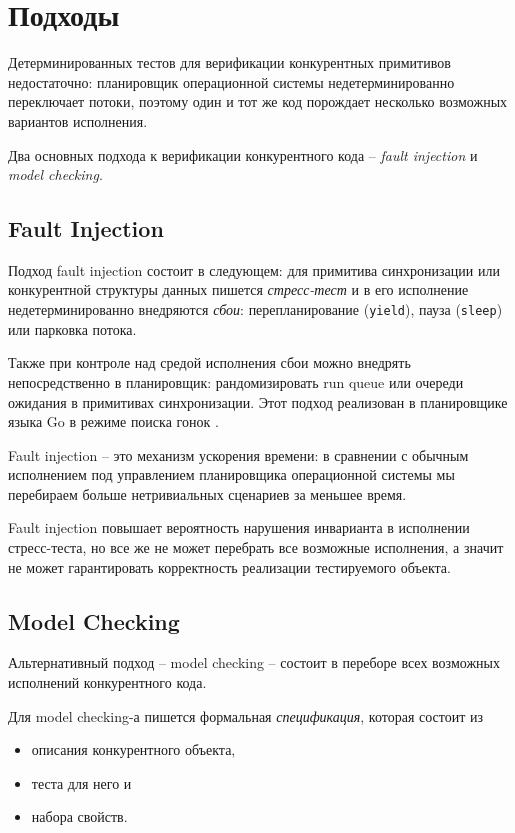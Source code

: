 \section{Подходы}

Детерминированных тестов для верификации конкурентных примитивов недостаточно: планировщик операционной системы недетерминированно переключает потоки, поэтому один и тот же код порождает несколько возможных вариантов исполнения.

Два основных подхода к верификации конкурентного кода – \emph{fault injection} и \emph{model checking}.


\subsection{Fault Injection}

Подход fault injection состоит в следующем: для примитива синхронизации или конкурентной структуры данных пишется \emph{стресс-тест} и в его исполнение недетерминированно внедряются \emph{сбои}: перепланирование (\texttt{yield}), пауза (\texttt{sleep}) или парковка потока. 

Также при контроле над средой исполнения сбои можно внедрять непосредственно в планировщик: рандомизировать run queue или очереди ожидания в примитивах синхронизации. Этот подход реализован в планировщике языка Go в режиме поиска гонок \autocite{Go}.

Fault injection – это механизм ускорения времени: в сравнении с обычным исполнением под управлением планировщика операционной системы мы перебираем больше нетривиальных сценариев за меньшее время.

Fault injection повышает вероятность нарушения инварианта в исполнении стресс-теста, но все же не может перебрать все возможные исполнения, а значит не может гарантировать корректность реализации тестируемого объекта.


\subsection{Model Checking}

Альтернативный подход – model checking – состоит в переборе всех возможных исполнений конкурентного кода. 

Для model checking-а пишется формальная \emph{спецификация}, которая состоит из

\begin{itemize}
\item	описания конкурентного объекта,

\item	теста для него и

\item	набора свойств.
\end{itemize}

